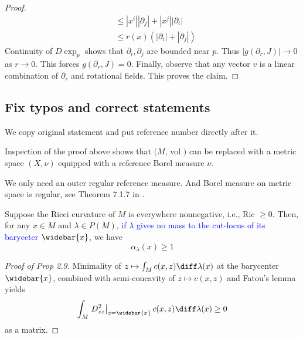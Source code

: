 \begin{proof}
\[\begin{aligned}
                                                                     & \leq \left| x ^ { i } \right| \left| \partial _ { j } \right| + \left| x ^ { j } \right| \left| \partial _ { i } \right| \\
                                                                     & \leq r ( x ) \left( \left| \partial _ { i } \right| + \left| \partial _ { j } \right| \right)\end{aligned} \]
	Continuity of \( D \exp _ { p } \) shows that \( \partial _ { i } , \partial _ { j } \) are bounded near \( p .  \)
	Thus \( \left| g \left( \partial _ { r } , J \right) \right| \rightarrow 0 \) as \( r \rightarrow 0 .  \)
	This forces \( g \left( \partial _ { r } , J \right) = 0 .\)
	Finally, observe that any vector \( v \) is a linear combination of \( \partial _ { r } \) and rotational fields.
	This proves the claim.
\end{proof}

\subsection{Fix typos and correct statements}

We copy original statement and put reference number directly after it.

\begin{rmk}[Remark 2.2]
	Inspection of the proof above shows that \( ( M \), vol \( ) \) can be replaced with a  metric space \( ( X , \nu ) \) equipped with a reference Borel measure \( \nu \).
\end{rmk}

We only need an outer regular reference measure. And Borel measure on metric space is regular, see Theorem 7.1.7 in \cite{Bogachev2007}.

\begin{prop}
	Suppose the Ricci curvature of \( M \) is everywhere nonnegative, i.e., Ric \( \geq 0 . \) Then, for any \( x \in M \) and \( \lambda \in P ( M ) \), \textcolor{blue}{if $\lambda$ gives no mass to the cut-locus of its baryceter $\widebar{x}$}, we have
	\[ \alpha _ { \lambda } ( x ) \geq 1 \]
\end{prop}

\begin{proof}[Proof of Prop 2.9]
	Minimality of \( z \mapsto \int _ { M } c ( x , z ) \diff \lambda ( x ) \) at the barycenter \( \widebar { x } \), combined with semi-concavity of \( z \mapsto c ( x , z ) \) and Fatou's lemma yields
	\[
		\int _ { M } \left. D _ { z z } ^ { 2 } \right| _ { z = \widebar { x } } c ( x , z ) \diff \lambda ( x ) \geq 0
	\] as a matrix.
\end{proof}

